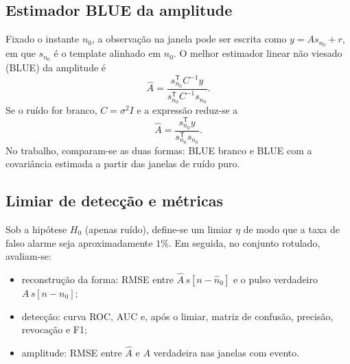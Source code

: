 \subsection{Estimador BLUE da amplitude}

Fixado o instante \(n_0\), a observação na janela pode ser escrita como
\(y = A s_{n_0} + r\), em que \(s_{n_0}\) é o template alinhado em \(n_0\). O
melhor estimador linear não viesado (BLUE) da amplitude é
\begin{equation}
\hat{A} = \frac{s_{n_0}^{\mathsf{T}} C^{-1} y}{s_{n_0}^{\mathsf{T}} C^{-1} s_{n_0}}.
\end{equation}
Se o ruído for branco, \(C = \sigma^2 I\) e a expressão reduz-se a
\begin{equation}
\hat{A} = \frac{s_{n_0}^{\mathsf{T}} y}{s_{n_0}^{\mathsf{T}} s_{n_0}}.
\end{equation}
No trabalho, comparam-se as duas formas: BLUE branco e BLUE com a covariância
estimada a partir das janelas de ruído puro.

\subsection{Limiar de detecção e métricas}

Sob a hipótese \(H_0\) (apenas ruído), define-se um limiar \(\eta\) de modo que
a taxa de falso alarme seja aproximadamente \(1\%\). Em seguida, no conjunto
rotulado, avaliam-se:
\begin{itemize}
  \item reconstrução da forma: RMSE entre \(\hat{A}\,s[n-\hat{n}_0]\) e o pulso
  verdadeiro \(A\,s[n-n_0]\);
  \item detecção: curva ROC, AUC e, após o limiar, matriz de confusão, precisão,
  revocação e F1;
  \item amplitude: RMSE entre \(\hat{A}\) e \(A\) verdadeira nas janelas com
  evento.
\end{itemize}
